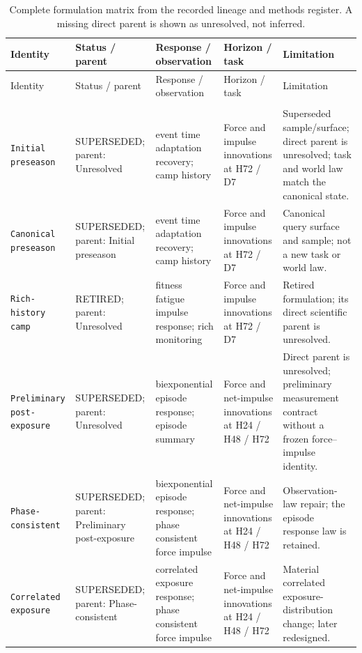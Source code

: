 \footnotesize
\setlength{\tabcolsep}{2.6pt}
\renewcommand{\arraystretch}{1.12}
\begin{longtable}{>{\raggedright\arraybackslash}p{0.95in}>{\raggedright\arraybackslash}p{1.10in}>{\raggedright\arraybackslash}p{1.50in}>{\raggedright\arraybackslash}p{1.10in}>{\raggedright\arraybackslash}p{1.15in}}
\caption{Complete formulation matrix from the recorded lineage and methods register. A missing direct parent is shown as unresolved, not inferred.}\label{supp:formulations}\\
\toprule
Identity & Status / parent & Response / observation & Horizon / task & Limitation \\
\midrule
\endfirsthead
\toprule
Identity & Status / parent & Response / observation & Horizon / task & Limitation \\
\midrule
\endhead
\midrule
\multicolumn{5}{r}{Continued on next page}\\
\endfoot
\bottomrule
\endlastfoot
\texttt{Initial preseason} & SUPERSEDED; parent: Unresolved & event time adaptation recovery; camp history & Force and impulse innovations at H72 / D7 & Superseded sample/surface; direct parent is unresolved; task and world law match the canonical state. \\
\texttt{Canonical preseason} & SUPERSEDED; parent: Initial preseason & event time adaptation recovery; camp history & Force and impulse innovations at H72 / D7 & Canonical query surface and sample; not a new task or world law. \\
\texttt{Rich-history camp} & RETIRED; parent: Unresolved & fitness fatigue impulse response; rich monitoring & Force and impulse innovations at H72 / D7 & Retired formulation; its direct scientific parent is unresolved. \\
\texttt{Preliminary post-exposure} & SUPERSEDED; parent: Unresolved & biexponential episode response; episode summary & Force and net-impulse innovations at H24 / H48 / H72 & Direct parent is unresolved; preliminary measurement contract without a frozen force–impulse identity. \\
\texttt{Phase-consistent} & SUPERSEDED; parent: Preliminary post-exposure & biexponential episode response; phase consistent force impulse & Force and net-impulse innovations at H24 / H48 / H72 & Observation-law repair; the episode response law is retained. \\
\texttt{Correlated exposure} & SUPERSEDED; parent: Phase-consistent & correlated exposure response; phase consistent force impulse & Force and net-impulse innovations at H24 / H48 / H72 & Material correlated exposure-distribution change; later redesigned. \\

\end{longtable}
